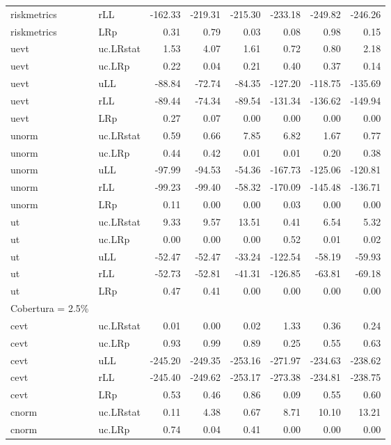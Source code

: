 \begin{longtable}{llrrrrrr}
  riskmetrics & rLL & -162.33 & -219.31 & -215.30 & -233.18 & -249.82 & -246.26 \\ 
  riskmetrics & LRp & 0.31 & 0.79 & 0.03 & 0.08 & 0.98 & 0.15 \\ 
  uevt & uc.LRstat & 1.53 & 4.07 & 1.61 & 0.72 & 0.80 & 2.18 \\ 
  uevt & uc.LRp & 0.22 & 0.04 & 0.21 & 0.40 & 0.37 & 0.14 \\ 
  uevt & uLL & -88.84 & -72.74 & -84.35 & -127.20 & -118.75 & -135.69 \\ 
  uevt & rLL & -89.44 & -74.34 & -89.54 & -131.34 & -136.62 & -149.94 \\ 
  uevt & LRp & 0.27 & 0.07 & 0.00 & 0.00 & 0.00 & 0.00 \\ 
  unorm & uc.LRstat & 0.59 & 0.66 & 7.85 & 6.82 & 1.67 & 0.77 \\ 
  unorm & uc.LRp & 0.44 & 0.42 & 0.01 & 0.01 & 0.20 & 0.38 \\ 
  unorm & uLL & -97.99 & -94.53 & -54.36 & -167.73 & -125.06 & -120.81 \\ 
  unorm & rLL & -99.23 & -99.40 & -58.32 & -170.09 & -145.48 & -136.71 \\ 
  unorm & LRp & 0.11 & 0.00 & 0.00 & 0.03 & 0.00 & 0.00 \\ 
  ut & uc.LRstat & 9.33 & 9.57 & 13.51 & 0.41 & 6.54 & 5.32 \\ 
  ut & uc.LRp & 0.00 & 0.00 & 0.00 & 0.52 & 0.01 & 0.02 \\ 
  ut & uLL & -52.47 & -52.47 & -33.24 & -122.54 & -58.19 & -59.93 \\ 
  ut & rLL & -52.73 & -52.81 & -41.31 & -126.85 & -63.81 & -69.18 \\ 
  ut & LRp & 0.47 & 0.41 & 0.00 & 0.00 & 0.00 & 0.00 \\ 
  Cobertura = 2.5\% &  &  &  &  &  &  &  \\ 
  cevt & uc.LRstat & 0.01 & 0.00 & 0.02 & 1.33 & 0.36 & 0.24 \\ 
  cevt & uc.LRp & 0.93 & 0.99 & 0.89 & 0.25 & 0.55 & 0.63 \\ 
  cevt & uLL & -245.20 & -249.35 & -253.16 & -271.97 & -234.63 & -238.62 \\ 
  cevt & rLL & -245.40 & -249.62 & -253.17 & -273.38 & -234.81 & -238.75 \\ 
  cevt & LRp & 0.53 & 0.46 & 0.86 & 0.09 & 0.55 & 0.60 \\ 
  cnorm & uc.LRstat & 0.11 & 4.38 & 0.67 & 8.71 & 10.10 & 13.21 \\ 
  cnorm & uc.LRp & 0.74 & 0.04 & 0.41 & 0.00 & 0.00 & 0.00 \\ 

\end{longtable}
